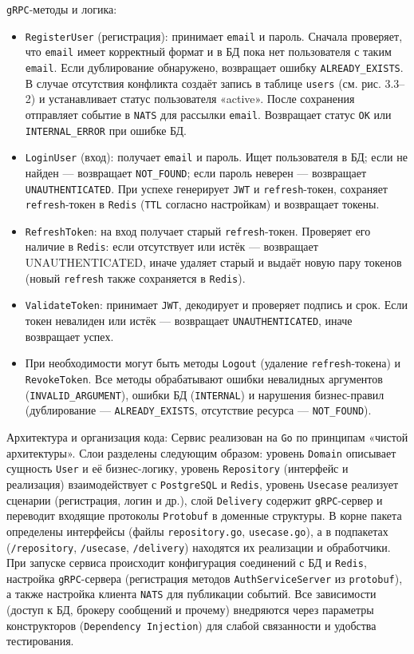 \texttt{gRPC}-методы и логика:
\begin{itemize}
    \item \texttt{RegisterUser} (регистрация): принимает \texttt{email} и пароль. Сначала проверяет, что \texttt{email} имеет корректный формат и в БД пока нет пользователя с таким \texttt{email}. Если дублирование обнаружено, возвращает ошибку \texttt{ALREADY\_EXISTS}. В случае отсутствия конфликта создаёт запись в таблице \texttt{users} (см. рис. 3.3–2) и устанавливает статус пользователя «active». После сохранения отправляет событие в \texttt{NATS} для рассылки \texttt{email}. Возвращает статус \texttt{OK} или \texttt{INTERNAL\_ERROR} при ошибке БД.
    \item \texttt{LoginUser} (вход): получает \texttt{email} и пароль. Ищет пользователя в БД; если не найден — возвращает \texttt{NOT\_FOUND}; если пароль неверен — возвращает \texttt{UNAUTHENTICATED}. При успехе генерирует \texttt{JWT} и \texttt{refresh}-токен, сохраняет \texttt{refresh}-токен в \texttt{Redis} (\texttt{TTL} согласно настройкам) и возвращает токены.
    \item \texttt{RefreshToken}: на вход получает старый \texttt{refresh}-токен. Проверяет его наличие в \texttt{Redis}: если отсутствует или истёк — возвращает \\ UNAUTHENTICATED, иначе удаляет старый и выдаёт новую пару токенов (новый \texttt{refresh} также сохраняется в \texttt{Redis}).
    \item \texttt{ValidateToken}: принимает \texttt{JWT}, декодирует и проверяет подпись и срок. Если токен невалиден или истёк — возвращает \texttt{UNAUTHENTICATED}, иначе возвращает успех.
    \item При необходимости могут быть методы \texttt{Logout} (удаление \texttt{refresh}-токена) и \texttt{RevokeToken}. Все методы обрабатывают ошибки невалидных аргументов (\texttt{INVALID\_ARGUMENT}), ошибки БД (\texttt{INTERNAL}) и нарушения бизнес-правил (дублирование — \texttt{ALREADY\_EXISTS}, отсутствие ресурса — \texttt{NOT\_FOUND}).
\end{itemize}
\noindent Архитектура и организация кода: Сервис реализован на \texttt{Go} по принципам «чистой архитектуры». Слои разделены следующим образом: уровень \texttt{Domain} описывает сущность \texttt{User} и её бизнес-логику, уровень \texttt{Repository} (интерфейс и реализация) взаимодействует с \texttt{PostgreSQL} и \texttt{Redis}, уровень \texttt{Usecase} реализует сценарии (регистрация, логин и др.), слой \texttt{Delivery} содержит \texttt{gRPC}-сервер и переводит входящие протоколы \texttt{Protobuf} в доменные структуры. В корне пакета определены интерфейсы (файлы \texttt{repository.go}, \texttt{usecase.go}), а в подпакетах (\texttt{/repository}, \texttt{/usecase}, \texttt{/delivery}) находятся их реализации и обработчики. При запуске сервиса происходит конфигурация соединений с БД и \texttt{Redis}, настройка \texttt{gRPC}-сервера (регистрация методов \texttt{AuthServiceServer} из \texttt{protobuf}), а также настройка клиента \texttt{NATS} для публикации событий. Все зависимости (доступ к БД, брокеру сообщений и прочему) внедряются через параметры конструкторов (\texttt{Dependency Injection}) для слабой связанности и удобства тестирования.

